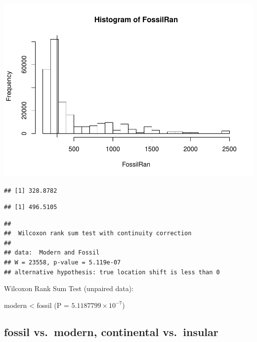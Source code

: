 \documentclass[]{article}
\begin{document}
\includegraphics{MA_JJ_files/figure-latex/randon sampling modern fossil-1.pdf}

\begin{verbatim}
## [1] 328.8782
\end{verbatim}

\begin{verbatim}
## [1] 496.5105
\end{verbatim}

\begin{verbatim}
## 
##  Wilcoxon rank sum test with continuity correction
## 
## data:  Modern and Fossil
## W = 23558, p-value = 5.119e-07
## alternative hypothesis: true location shift is less than 0
\end{verbatim}

Wilcoxon Rank Sum Test (unpaired data):

modern \textless{} fossil (P = \(5.1187799\times 10^{-7}\))

\newpage

\subsection{fossil vs.~modern, continental
vs.~insular}\label{fossil-vs.modern-continental-vs.insular}
\end{document}
